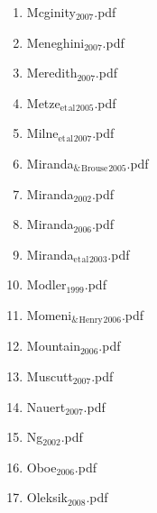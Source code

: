 \documentclass[11pt]{article}
\begin{document}
\begin{enumerate}
\begin{enumerate}
\item Mcginity$_{\text{2007}}$.pdf
\label{sec-1-1-1-1-11-19-17-97}

\item Meneghini$_{\text{2007}}$.pdf
\label{sec-1-1-1-1-11-19-17-98}

\item Meredith$_{\text{2007}}$.pdf
\label{sec-1-1-1-1-11-19-17-99}

\item Metze$_{\text{et}}$$_{\text{al}}$$_{\text{2005}}$.pdf
\label{sec-1-1-1-1-11-19-17-100}

\item Milne$_{\text{et}}$$_{\text{al}}$$_{\text{2007}}$.pdf
\label{sec-1-1-1-1-11-19-17-101}

\item Miranda$_{\text{\&}}$$_{\text{Brouse}}$$_{\text{2005}}$.pdf
\label{sec-1-1-1-1-11-19-17-102}

\item Miranda$_{\text{2002}}$.pdf
\label{sec-1-1-1-1-11-19-17-103}

\item Miranda$_{\text{2006}}$.pdf
\label{sec-1-1-1-1-11-19-17-104}

\item Miranda$_{\text{et}}$$_{\text{al}}$$_{\text{2003}}$.pdf
\label{sec-1-1-1-1-11-19-17-105}

\item Modler$_{\text{1999}}$.pdf
\label{sec-1-1-1-1-11-19-17-106}

\item Momeni$_{\text{\&}}$$_{\text{Henry}}$$_{\text{2006}}$.pdf
\label{sec-1-1-1-1-11-19-17-107}

\item Mountain$_{\text{2006}}$.pdf
\label{sec-1-1-1-1-11-19-17-108}

\item Muscutt$_{\text{2007}}$.pdf
\label{sec-1-1-1-1-11-19-17-109}

\item Nauert$_{\text{2007}}$.pdf
\label{sec-1-1-1-1-11-19-17-110}

\item Ng$_{\text{2002}}$.pdf
\label{sec-1-1-1-1-11-19-17-111}

\item Oboe$_{\text{2006}}$.pdf
\label{sec-1-1-1-1-11-19-17-112}

\item Oleksik$_{\text{2008}}$.pdf
\label{sec-1-1-1-1-11-19-17-113}


\end{enumerate}
\end{enumerate}
\end{document}

